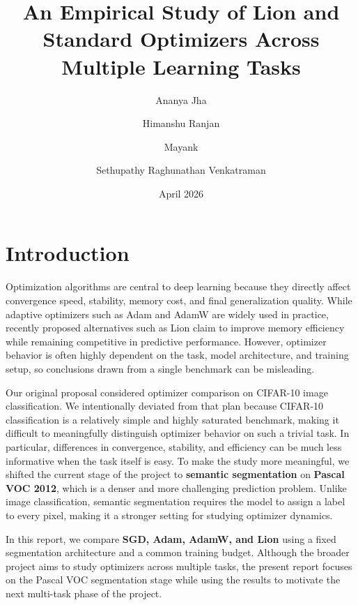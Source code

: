 \documentclass[10pt]{article}
\title{\vspace{-1.0em}An Empirical Study of Lion and Standard Optimizers Across Multiple Learning Tasks\vspace{-0.6em}}
\author{Ananya Jha \and Himanshu Ranjan \and Mayank \and Sethupathy Raghunathan Venkatraman}
\date{\vspace{-0.8em}April 2026\vspace{-1.0em}}
\begin{document}
\maketitle
\vspace{-1.2em}

\section{Introduction}
Optimization algorithms are central to deep learning because they directly affect convergence speed, stability, memory cost, and final generalization quality. While adaptive optimizers such as Adam and AdamW are widely used in practice, recently proposed alternatives such as Lion claim to improve memory efficiency while remaining competitive in predictive performance. However, optimizer behavior is often highly dependent on the task, model architecture, and training setup, so conclusions drawn from a single benchmark can be misleading.

Our original proposal considered optimizer comparison on CIFAR-10 image classification. We intentionally deviated from that plan because CIFAR-10 classification is a relatively simple and highly saturated benchmark, making it difficult to meaningfully distinguish optimizer behavior on such a trivial task. In particular, differences in convergence, stability, and efficiency can be much less informative when the task itself is easy. To make the study more meaningful, we shifted the current stage of the project to \textbf{semantic segmentation} on \textbf{Pascal VOC 2012}, which is a denser and more challenging prediction problem. Unlike image classification, semantic segmentation requires the model to assign a label to every pixel, making it a stronger setting for studying optimizer dynamics.

In this report, we compare \textbf{SGD, Adam, AdamW, and Lion} using a fixed segmentation architecture and a common training budget. Although the broader project aims to study optimizers across multiple tasks, the present report focuses on the Pascal VOC segmentation stage while using the results to motivate the next multi-task phase of the project.
\end{document}
